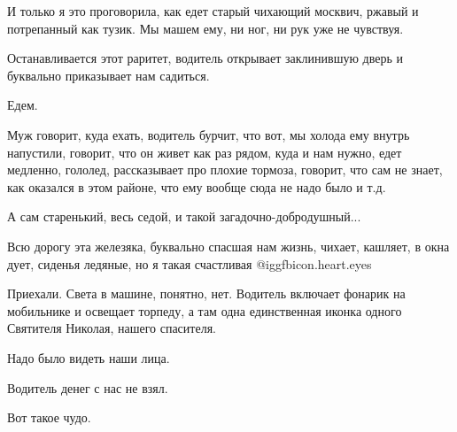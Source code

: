 И только я это проговорила, как едет старый чихающий москвич, ржавый и
потрепанный как тузик. Мы машем ему, ни ног, ни рук уже не чувствуя. 

Останавливается этот раритет, водитель открывает заклинившую дверь и буквально
приказывает нам садиться.

Едем. 

Муж говорит, куда ехать, водитель бурчит, что вот, мы холода ему внутрь
напустили, говорит, что он живет как раз рядом, куда и нам нужно, едет
медленно, гололед, рассказывает про плохие тормоза, говорит, что сам не знает,
как оказался в этом районе, что ему вообще сюда не надо было и т.д. 

А сам старенький, весь седой, и такой загадочно-добродушный...

Всю дорогу эта железяка, буквально спасшая нам жизнь, чихает, кашляет, в окна
дует, сиденья ледяные, но я такая счастливая @igg{fbicon.heart.eyes} 

Приехали. Света в машине, понятно, нет. Водитель включает фонарик на мобильнике
и освещает торпеду, а там одна единственная иконка одного Святителя Николая,
нашего спасителя. 

Надо было видеть наши лица.

Водитель денег с нас не взял.

Вот такое чудо.
